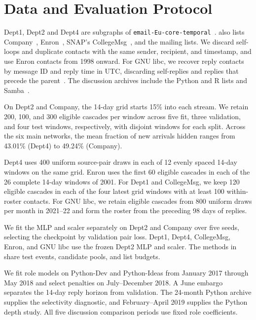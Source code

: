 \section{Data and Evaluation Protocol}
Dept1, Dept2 and Dept4 are subgraphs of \texttt{email-Eu-core-temporal}~\cite{motifs}.  also lists Company~\cite{origcompany,company,rossi}, Enron~\cite{enron,priebe}, SNAP's CollegeMsg~\cite{college,snapcollegemsg}, and the mailing lists. We discard self-loops and duplicate contacts with the same sender, recipient, and timestamp, and use Enron contacts from 1998 onward. For GNU libc, we recover reply contacts by message ID and reply time in UTC, discarding self-replies and replies that precede the parent~\cite{libc}. The discussion archives include the Python and R lists and Samba~\cite{pythondev,pythonideas,rdevel,rpackagedevel,sambatechnical}.
{\renewcommand{\arraystretch}{0.94}}

On Dept2 and Company, the 14-day grid starts 15\% into each stream. We retain 200, 100, and 300 eligible cascades per window across five fit, three validation, and four test windows, respectively, with disjoint windows for each split. Across the six main networks, the mean fraction of new arrivals hidden ranges from 43.01\% (Dept4) to 49.24\% (Company).

Dept4 uses 400 uniform source-pair draws in each of 12 evenly spaced 14-day windows on the same grid. Enron uses the first 60 eligible cascades in each of the 26 complete 14-day windows of 2001. For Dept1 and CollegeMsg, we keep 120 eligible cascades in each of the four latest grid windows with at least 100 within-roster contacts. For GNU libc, we retain eligible cascades from 800 uniform draws per month in 2021--22 and form the roster from the preceding 98 days of replies.

We fit the MLP and scaler separately on Dept2 and Company over five seeds, selecting the checkpoint by validation pair loss. Dept1, Dept4, CollegeMsg, Enron, and GNU libc use the frozen Dept2 MLP and scaler. The methods in  share test events, candidate pools, and list budgets.

We fit role models on Python-Dev and Python-Ideas from January 2017 through May 2018 and select penalties on July--December 2018. A June embargo separates the 14-day reply horizon from validation. The 24-month Python archive supplies the selectivity diagnostic, and February--April 2019 supplies the Python depth study. All five discussion comparison periods use fixed role coefficients.


